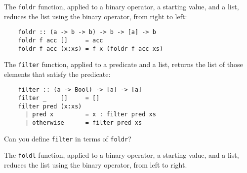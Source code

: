 \documentclass[a4paper,10pt,addpoints]{exam}
\begin{document}
\begin{center}
\end{center}

\vspace{0.1in}


\vspace{0.2in}

\begin{questions}


  \question[1]

  The \texttt{foldr} function, applied to a binary operator, a
  starting value, and a list, reduces the list using the binary
  operator, from right to left:

  \begin{verbatim}
    foldr :: (a -> b -> b) -> b -> [a] -> b
    foldr f acc []     = acc
    foldr f acc (x:xs) = f x (foldr f acc xs)
  \end{verbatim}

  The \texttt{filter} function, applied to a predicate and a list,
  returns the list of those elements that satisfy the predicate:

  \begin{verbatim}
    filter :: (a -> Bool) -> [a] -> [a]
    filter _    []     = []
    filter pred (x:xs)
      | pred x         = x : filter pred xs
      | otherwise      = filter pred xs
  \end{verbatim}

  Can you define \texttt{filter} in terms of \texttt{foldr}?



  \question

  The \texttt{foldl} function, applied to a binary operator, a
  starting value, and a list, reduces the list using the binary
  operator, from left to right.

  \begin{parts}

    \part[1]


\end{parts}
\end{questions}
\end{document}
